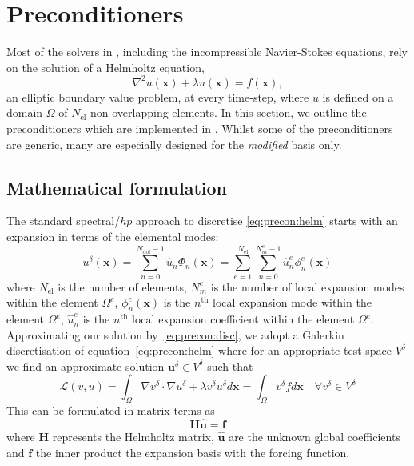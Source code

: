 \section{Preconditioners}
\label{sec:precon}

Most of the solvers in \nekpp, including the incompressible Navier-Stokes
equations, rely on the solution of a Helmholtz equation,
%
\begin{equation}
  \nabla^{2}u(\mathbf{x})+\lambda u(\mathbf{x})=f(\mathbf{x}),
  \label{eq:precon:helm}
\end{equation}
%
an elliptic boundary value problem, at every time-step, where $u$ is defined on
a domain $\Omega$ of $N_{\mathrm{el}}$ non-overlapping elements. In this
section, we outline the preconditioners which are implemented in \nekpp. Whilst
some of the preconditioners are generic, many are especially designed for the
\emph{modified} basis only.

\subsection{Mathematical formulation}

The standard spectral/$hp$ approach to discretise \eqref{eq:precon:helm} starts
with an expansion in terms of the elemental modes:
%
\begin{equation}
  u^{\delta}(\mathbf{x})=\sum_{n=0}^{N_{\mathrm{dof}}-1}\hat{u}_n
  \Phi_n(\mathbf{x})=\sum_{e=1}^{{N_{\mathrm{el}}}}
  \sum_{n=0}^{N^{e}_m-1}\hat{u}_n^e\phi_n^e(\mathbf{x})
  \label{eq:precon:disc}
\end{equation}
%
where $N_{\mathrm{el}}$ is the number of elements, $N^{e}_m$ is the number of
local expansion modes within the element $\Omega^e$, $\phi_n^e(\mathbf{x})$ is
the $n^{\mathrm{th}}$ local expansion mode within the element $\Omega^e$,
$\hat{u}_n^e$ is the $n^{\mathrm{th}}$ local expansion coefficient within the
element $\Omega^e$. Approximating our solution by~\eqref{eq:precon:disc}, we
adopt a Galerkin discretisation of equation~\eqref{eq:precon:helm} where for an
appropriate test space $V^\delta$ we find an approximate solution
$\mathbf{u}^{\delta} \in V^{\delta}$ such that
%
\[
\mathcal L \left({v, u}\right) = \int_{\Omega}\nabla v^{\delta} \cdot \nabla
u^{\delta} + \lambda v^{\delta} u^{\delta} d \mathbf{x} = \int_{\Omega}
v^{\delta} f d\mathbf{x} \quad \forall v^{\delta} \in V^{\delta}
\]
%
This can be formulated in matrix terms as
%
\[
\mathbf{H}\hat{\mathbf{u}} = \mathbf{f}
\]
%
where $\mathbf{H}$ represents the Helmholtz matrix, $\hat{\mathbf{u}}$ are the
unknown global coefficients and $\mathbf{f}$ the inner product the expansion
basis with the forcing function.

